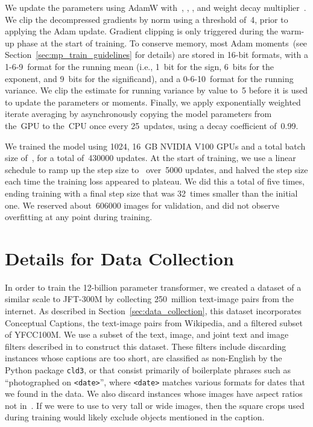 \documentclass{article}
\begin{document}
We update the parameters using AdamW with~, , , and weight decay multiplier~. We clip the decompressed gradients by norm using a threshold of~4, prior to applying the Adam update. Gradient clipping is only triggered during the warm-up phase at the start of training. To conserve memory, most Adam moments~(see Section~\ref{sec:mp_train_guidelines} for details) are stored in 16-bit formats, with a 1-6-9~format for the running mean (i.e., 1~bit for the sign, 6~bits for the exponent, and 9~bits for the significand), and a 0-6-10~format for the running variance. We clip the estimate for running variance by value to~5 before it is used to update the parameters or moments. Finally, we apply exponentially weighted iterate averaging by asynchronously copying the model parameters from the~GPU to the~CPU once every 25~updates, using a decay coefficient of~0.99.

We trained the model using 1024, 16~GB NVIDIA V100 GPUs and a total batch size of~, for a total of~\num{430000} updates. At the start of training, we use a linear schedule to ramp up the step size to~ over~\num{5000} updates, and halved the step size each time the training loss appeared to plateau. We did this a total of five times, ending training with a final step size that was 32~times smaller than the initial one. We reserved about~\num{606000} images for validation, and did not observe overfitting at any point during training.

\section{Details for Data Collection}
\label{sec:data_collection_details}

In order to train the 12-billion parameter transformer, we created a dataset of a similar scale to JFT-300M by collecting 250~million text-image pairs from the internet. As described in Section~\ref{sec:data_collection}, this dataset incorporates Conceptual Captions, the text-image pairs from Wikipedia, and a filtered subset of YFCC100M. We use a subset of the text, image, and joint text and image filters described in \citet{sharma2018conceptual} to construct this dataset. These filters include discarding instances whose captions are too short, are classified as non-English by the Python package \texttt{cld3}, or that consist primarily of boilerplate phrases such as ``photographed on \texttt{<date>}'', where \texttt{<date>} matches various formats for dates that we found in the data. We also discard instances whose images have aspect ratios not in~. If we were to use to very tall or wide images, then the square crops used during training would likely exclude objects mentioned in the caption.
\end{document}
